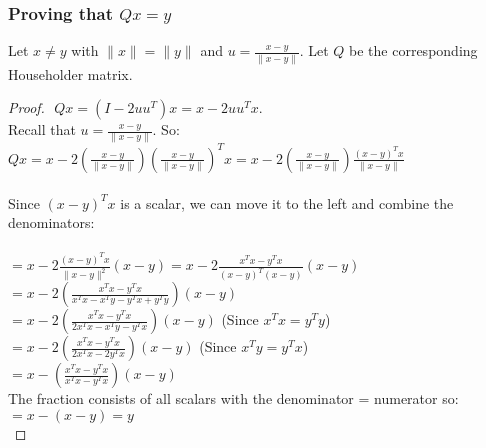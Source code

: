 \documentclass[12pt]{article}
\begin{document}
\subsubsection{Proving that $Qx=y$}
Let $x \neq y$ with $\|x\| = \|y\|$ and $u = \frac{x-y}{\|x-y\|}$. Let $Q$ be the corresponding Householder matrix. \\
\begin{proof} $ $\newline
$Qx = (I - 2uu^T)x = x-2uu^Tx. $ \\
Recall that $u = \frac{x-y}{\|x-y\|}$. So: \\
$Qx = x - 2\left(\frac{x-y}{\|x-y\|}\right)\left(\frac{x-y}{\|x-y\|}\right)^Tx 
= x - 2\left(\frac{x-y}{\|x-y\|}\right)\frac{(x-y)^Tx}{\|x-y\|}$ \\ \\
Since $(x-y)^Tx$ is a scalar, we can move it to the left and combine the denominators: \\ \\
$= x-2\frac{(x-y)^Tx}{\|x-y\|^2}(x-y)
= x-2\frac{x^Tx-y^Tx}{(x-y)^T(x-y)}(x-y)$ \\
$ = x-2\left(\frac{x^Tx-y^Tx}{x^Tx-x^Ty-y^Tx+y^Ty}\right)(x-y) $ \\
$= x-2\left(\frac{x^Tx-y^Tx}{2x^Tx-x^Ty-y^Tx}\right)(x-y)$ (Since $x^Tx = y^Ty$) \\
$ = x-2\left(\frac{x^Tx-y^Tx}{2x^Tx-2y^Tx}\right)(x-y)$ (Since $x^Ty = y^Tx$) \\
$ = x-\left(\frac{x^Tx-y^Tx}{x^Tx-y^Tx}\right)(x-y)$ \\
The fraction consists of all scalars with the denominator = numerator so: \\
$ = x-(x-y) = y$ \\
\end{proof}
\end{document}
